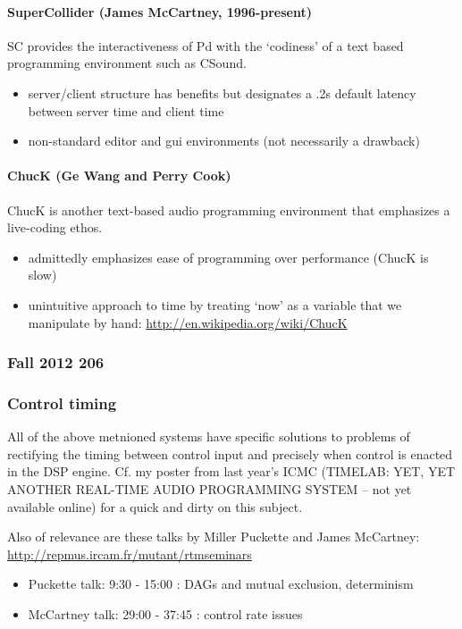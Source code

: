 \documentclass{article}
\begin{document}
\paragraph{SuperCollider (James McCartney, 1996-present)}
SC provides the interactiveness of Pd with the `codiness' of a text based programming environment such as CSound.
\begin{itemize}
\item server/client structure has benefits but designates a .2s default latency between server time and client time%
\item non-standard editor and gui environments (not necessarily a drawback)
\end{itemize}

\paragraph{ChucK (Ge Wang and Perry Cook)}
ChucK is another text-based audio programming environment that emphasizes a live-coding ethos. 
\begin{itemize}
\item admittedly emphasizes ease of programming over performance (ChucK is slow)
\item unintuitive approach to time by treating `now' as a variable that we manipulate by hand: \url{http://en.wikipedia.org/wiki/ChucK}
\end{itemize}

\subsubsection{Fall 2012 206}
\subsubsection{Control timing}
All of the above metnioned systems have specific solutions to problems of rectifying the timing between control input and precisely when control is enacted in the DSP engine. Cf. my poster from last year's ICMC (TIMELAB: YET, YET ANOTHER REAL-TIME AUDIO PROGRAMMING SYSTEM -- not yet available online) for a quick and dirty on this subject.

Also of relevance are these talks by Miller Puckette and James McCartney:
\url{http://repmus.ircam.fr/mutant/rtmseminars}
\begin{itemize}
\item Puckette talk: 9:30 - 15:00 : DAGs and mutual exclusion, determinism
\item McCartney talk: 29:00 - 37:45 : control rate issues
\end{itemize}
\end{document}

